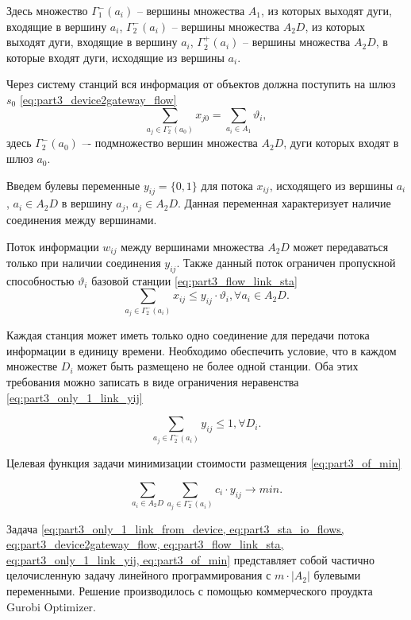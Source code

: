 Здесь множество $\Gamma_1^-(a_i)$ -- вершины множества $A_1$, из которых выходят дуги, входящие в вершину $a_i$, $\Gamma_2^-(a_i)$ -- вершины множества $A_2D$, из которых выходят дуги, входящие в  вершину $a_i$, $\Gamma_2^+(a_i)$ -- вершины множества $A_2D$, в которые входят дуги, исходящие из вершины  $a_i$.

Через систему станций вся информация от объектов  должна поступить на шлюз $s_0$ \cref{eq:part3_device2gateway_flow} 
\begin{equation}\label{eq:part3_device2gateway_flow}
    \sum_{a_j \in \Gamma_2^-(a_0)} x_{j0} = \sum_{a_i \in A_1} \vartheta_i,
\end{equation}
здесь $\Gamma_2^-(a_0)$ –- подмножество вершин множества $A_2D$, дуги которых входят в шлюз $a_0$.

Введем булевы переменные $y_{ij} = \{0,1\}$ для потока $x_{ij}$, исходящего из вершины $a_i$, $a_i \in A_2D$ в вершину $a_j$, $a_j \in A_2D$. Данная переменная характеризует наличие соединения между вершинами.

Поток информации $w_{ij}$ между вершинами множества $A_2D$ может передаваться только при наличии соединения $y_{ij}$. Также данный поток ограничен пропускной способностью $\vartheta_i$ базовой станции  \cref{eq:part3_flow_link_sta}
\begin{equation}\label{eq:part3_flow_link_sta}
    \sum_{a_j \in \Gamma_2^-(a_i)} x_{ij} \leqslant y_{ij} \cdot \vartheta_i, \forall a_i \in A_2D.
\end{equation}

Каждая станция может иметь только одно соединение для передачи потока информации в единицу времени. Необходимо обеспечить условие, что в каждом множестве $D_i$ может быть размещено не более одной станции. Оба этих требования можно записать в виде ограничения неравенства \cref{eq:part3_only_1_link_yij}

\begin{equation}\label{eq:part3_only_1_link_yij}
    \sum_{a_j \in \Gamma_2^-(a_i)} y_{ij} \leqslant 1, \forall D_i.
\end{equation}

Целевая функция задачи минимизации стоимости размещения \cref{eq:part3_of_min}

\begin{equation}\label{eq:part3_of_min}
    \sum_{a_i \in A_2D} \sum_{a_j \in \Gamma_2^-(a_i)}c_i \cdot y_{ij} \to min.
\end{equation}

Задача \cref{eq:part3_only_1_link_from_device, eq:part3_sta_io_flows, eq:part3_device2gateway_flow, eq:part3_flow_link_sta, eq:part3_only_1_link_yij, eq:part3_of_min} представляет собой частично целочисленную задачу линейного программирования с $m \cdot |A_2|$ булевыми переменными. Решение производилось с помощью коммерческого проудкта Gurobi Optimizer.


